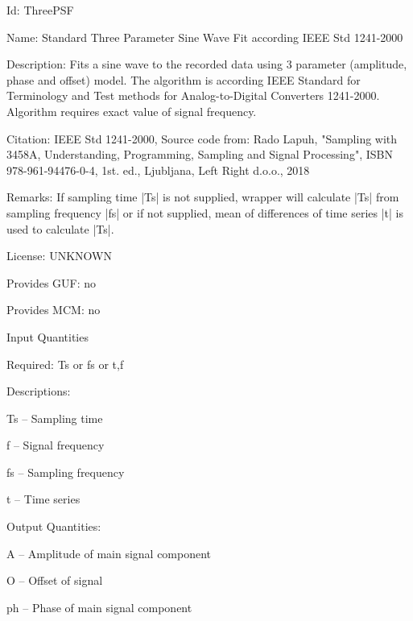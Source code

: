 \begin{tightdesc}
\item [Id:] ThreePSF
\item [Name:] Standard Three Parameter Sine Wave Fit according IEEE Std 1241-2000
\item [Description:] Fits a sine wave to the recorded data using 3 parameter (amplitude, phase and offset) model. The algorithm is according IEEE Standard for Terminology and Test methods for Analog-to-Digital Converters 1241-2000. Algorithm requires exact value of signal frequency.
\item [Citation:] IEEE Std 1241-2000, Source code from: Rado Lapuh, "Sampling with 3458A, Understanding, Programming, Sampling and Signal Processing", ISBN 978-961-94476-0-4, 1st. ed., Ljubljana, Left Right d.o.o., 2018
\item [Remarks:] If sampling time |Ts| is not supplied, wrapper will calculate |Ts| from sampling frequency |fs| or if not supplied, mean of differences of time series |t| is used to calculate |Ts|.
\item [License:] UNKNOWN
\item [Provides GUF:] no
\item [Provides MCM:] no
\item [Input Quantities] \rule{0em}{0em}
    \begin{tightdesc}
    \item [Required:] 
        \textsf{Ts} or \textsf{fs} or \textsf{t},\enspace \textsf{f}
    \item [Descriptions:] \rule{0em}{0em}
        \begin{tightdesc}
            \item[\textsf{Ts}] -- Sampling time
            \item[\textsf{f}] -- Signal frequency
            \item[\textsf{fs}] -- Sampling frequency
            \item[\textsf{t}] -- Time series
        \end{tightdesc}
    \end{tightdesc}
\item [Output Quantities:] \rule{0em}{0em}
    \begin{tightdesc}
        \item[\textsf{A}] -- Amplitude of main signal component
        \item[\textsf{O}] -- Offset of signal
        \item[\textsf{ph}] -- Phase of main signal component
    \end{tightdesc}
\end{tightdesc}
